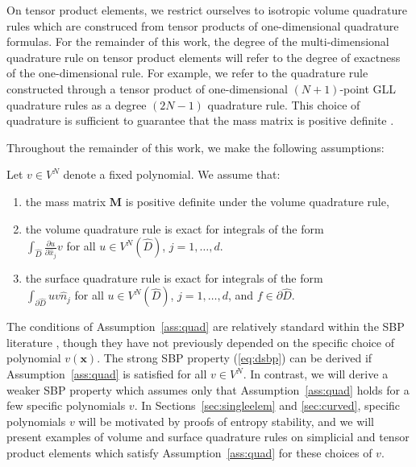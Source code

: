 \documentclass{svjour3}                     %
\renewcommand{\hat}{\widehat}
\newcommand{\pd}[2]{\frac{\partial#1}{\partial#2}}
\newcommand{\LRp}[1]{\left( #1 \right)}
\begin{document}
On tensor product elements, we restrict ourselves to isotropic volume quadrature rules which are construced from tensor products of one-dimensional quadrature formulas.  For the remainder of this work, the degree of the multi-dimensional quadrature rule on tensor product elements will refer to the degree of exactness of the one-dimensional rule.  For example, we refer to the quadrature rule constructed through a tensor product of one-dimensional $(N+1)$-point GLL quadrature rules as a degree $(2N-1)$ quadrature rule.  This choice of quadrature is sufficient to guarantee that the mass matrix is positive definite \cite{canuto2007spectral}.  

Throughout the remainder of this work, we make the following assumptions:
\begin{assumption}
\label{ass:quad}
Let $v \in V^{N}$ denote a fixed polynomial.  We assume that: 
\begin{enumerate}
\item the mass matrix $\bm{M}$ is positive definite under the volume quadrature rule,
\item the volume quadrature rule is exact for integrals of the form\\$\int_{\hat{D}} \pd{u}{\hat{x}_j} v$ for all $u \in V^N\LRp{\hat{D}}$, $j = 1,\ldots, d$.
\item the surface quadrature rule is exact for integrals of the form\\$\int_{\partial \hat{D}} u v \hat{n}_j$ for all $u \in V^N\LRp{\hat{D}}$, $j = 1,\ldots, d$, and $f \in \partial \hat{D}$.  
\end{enumerate}
\end{assumption}

The conditions of Assumption~\ref{ass:quad} are relatively standard within the SBP literature \cite{hicken2016multidimensional, chan2017discretely, crean2018entropy}, though they have not previously depended on the specific choice of polynomial $v(\bm{x})$.   The strong SBP property (\ref{eq:dsbp}) can be derived if Assumption~\ref{ass:quad} is satisfied for all $v \in V^N$.  In contrast, we will derive a weaker SBP property which assumes only that Assumption~\ref{ass:quad} holds for a few specific polynomials $v$.  In Sections~\ref{sec:singleelem} and \ref{sec:curved}, specific polynomials $v$ will be motivated by proofs of entropy stability, and we will present examples of volume and surface quadrature rules on simplicial and tensor product elements which satisfy Assumption~\ref{ass:quad} for these choices of $v$.  
\end{document}
